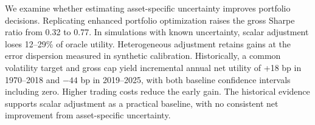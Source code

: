 We examine whether estimating asset-specific uncertainty improves portfolio decisions. Replicating enhanced portfolio optimization raises the gross Sharpe ratio from 0.32 to 0.77. In simulations with known uncertainty, scalar adjustment loses 12--29\% of oracle utility. Heterogeneous adjustment retains gains at the error dispersion measured in synthetic calibration. Historically, a common volatility target and gross cap yield incremental annual net utility of +18 bp in 1970--2018 and $-44$ bp in 2019--2025, with both baseline confidence intervals including zero. Higher trading costs reduce the early gain. The historical evidence supports scalar adjustment as a practical baseline, with no consistent net improvement from asset-specific uncertainty.
